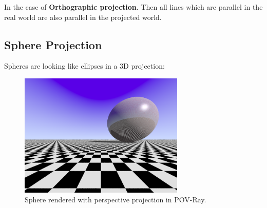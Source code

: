 \documentclass[a4paper,12pt]{article}
\begin{document}
	In the case of \textbf{Orthographic projection}. Then all lines which are parallel in the real world are also parallel in the projected world.
	
	\subsection{Sphere Projection}
	
	Spheres are looking like ellipses in a 3D projection:
	
	\begin{figure}[h!]
		\centering
		\includegraphics[width=0.7\textwidth]{E03.png}
		\caption{Sphere rendered with perspective projection in POV-Ray.}
	\end{figure}
	
	
\end{document}
